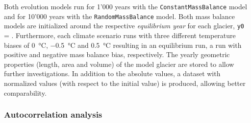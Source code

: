         Both evolution models run for 1'000 years with the \lstinline`ConstantMassBalance` model and for 10'000 years with the \lstinline`RandomMassBalance` model. Both mass balance models are initialized around the respective \textit{equilibrium year} for each glacier, \lstinline`y0` = \tstar. Furthermore, each climate scenario runs with three different temperature biases of \SI{0}{\celsius}, \SI{-0.5}{\celsius} and \SI{+0.5}{\celsius} resulting in an equilibrium run, a run with positive and negative mass balance bias, respectively. The yearly geometric properties (length, area and volume) of the model glacier are stored to allow further investigations. In addition to the absolute values, a dataset with normalized values (with respect to the initial value) is produced, allowing better comparability.


        \subsubsection{Autocorrelation analysis} %
        \label{ssub:autocorrelation_analysis_setup}

            
        


